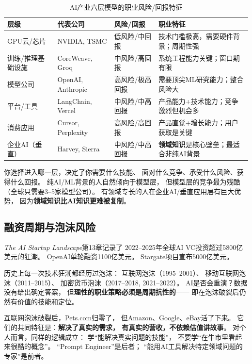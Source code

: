\begin{table}[htbp]
\centering
\caption{AI产业六层模型的职业风险/回报特征}
\label{tab:industry-layers-career}
\small
\begin{tabularx}{\textwidth}{l l l X}
\toprule
\rowcolor{figLightGray}
\textbf{层级} & \textbf{代表公司} & \textbf{风险/回报} & \textbf{职业特征} \\
\midrule
GPU云/芯片 & NVIDIA, TSMC & 低风险/中回报 &
  技术门槛极高，需要硬件背景；周期性强 \\
训练/推理基础设施 & CoreWeave, Groq & 中风险/高回报 &
  系统工程能力关键；窗口期有限 \\
模型公司 & OpenAI, Anthropic & 高风险/极高回报 &
  需要顶尖ML研究能力；整合风险大 \\
平台/工具 & LangChain, Vercel & 中风险/中高回报 &
  产品能力+技术能力；竞争激烈但机会多 \\
消费应用 & Cursor, Perplexity & 高风险/高回报 &
  产品直觉+增长能力；用户获取是关键 \\
企业AI（垂直） & Harvey, Sierra & 中风险/中高回报 &
  \textbf{领域知识}是核心壁垒；最适合非纯AI背景 \\
\bottomrule
\end{tabularx}
\end{table}

\begin{whybox}[为什么这张表对你重要]
你选择进入哪一层，决定了你需要什么技能、
面对什么竞争、承受什么风险、获得什么回报。
纯AI/ML背景的人自然倾向于模型层，
但模型层的竞争最为残酷（全球只需要3--5家模型公司）。
有领域专长的人在企业AI/垂直应用层有巨大优势，
因为\textbf{领域知识比AI知识更难被复制}。
\end{whybox}

\subsection{融资周期与泡沫风险}

\textit{The AI Startup Landscape}第13章记录了
2022--2025年全球AI VC投资超过5800亿美元的狂潮。
OpenAI单轮融资1100亿美元。
Stargate项目宣布5000亿美元。

历史上每一次技术狂潮都经历过泡沫：
互联网泡沫（1995--2001）、
移动互联网泡沫（2011--2015）、
加密货币泡沫（2017--2018, 2021--2022）。
AI是否会重演？数据没有给出确定答案，
但\textbf{理性的职业策略必须是周期抗性的}——
即在泡沫破裂后仍然有价值的技能和定位。

\begin{warnbox}[泡沫中的生存法则]
互联网泡沫破裂后，Pets.com归零了，
但Amazon、Google、eBay活了下来。
它们的共同特征是：\textbf{解决了真实的需求，
有真实的营收，不依赖估值讲故事}。
对个人而言，同样的逻辑成立：
学``能解决真实问题的技能''，
不要学``在牛市里看起来很酷的概念''。
``Prompt Engineer''是后者；
``能用AI工具解决特定领域问题的专家''是前者。
\end{warnbox}


